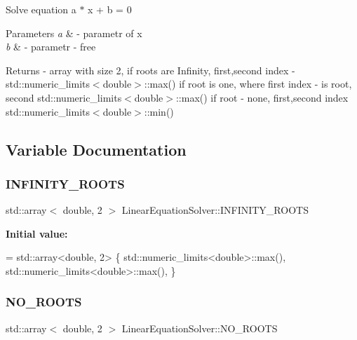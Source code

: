 Solve equation a $\ast$ x + b = 0 
\begin{DoxyParams}{Parameters}
{\em a} & -\/ parametr of x \\
\hline
{\em b} & -\/ parametr -\/ free \\
\hline
\end{DoxyParams}
\begin{DoxyReturn}{Returns}
-\/ array with size 2, if roots are Infinity, first,second index -\/ std\+::numeric\+\_\+limits$<$double$>$\+::max() if root is one, where first index -\/ is root, second std\+::numeric\+\_\+limits$<$double$>$\+::max() if root -\/ none, first,second index std\+::numeric\+\_\+limits$<$double$>$\+::min() 
\end{DoxyReturn}


\subsection{Variable Documentation}
\mbox{\label{namespaceLinearEquationSolver_a6cd24fa235d48f5dcf6c7a4c1765294a}} 
\subsubsection{\texorpdfstring{I\+N\+F\+I\+N\+I\+T\+Y\+\_\+\+R\+O\+O\+TS}{INFINITY\_ROOTS}}
{\footnotesize\ttfamily std\+::array$<$ double, 2 $>$ Linear\+Equation\+Solver\+::\+I\+N\+F\+I\+N\+I\+T\+Y\+\_\+\+R\+O\+O\+TS}

{\bfseries Initial value\+:}
\begin{DoxyCode}
= std::array<double, 2>    \{
            std::numeric\_limits<double>::max(),
            std::numeric\_limits<double>::max(),
    \}
\end{DoxyCode}
\mbox{\label{namespaceLinearEquationSolver_aff05fb63db0bf28f25867085c3c21dd5}} 
\subsubsection{\texorpdfstring{N\+O\+\_\+\+R\+O\+O\+TS}{NO\_ROOTS}}
{\footnotesize\ttfamily std\+::array$<$ double, 2 $>$ Linear\+Equation\+Solver\+::\+N\+O\+\_\+\+R\+O\+O\+TS}

